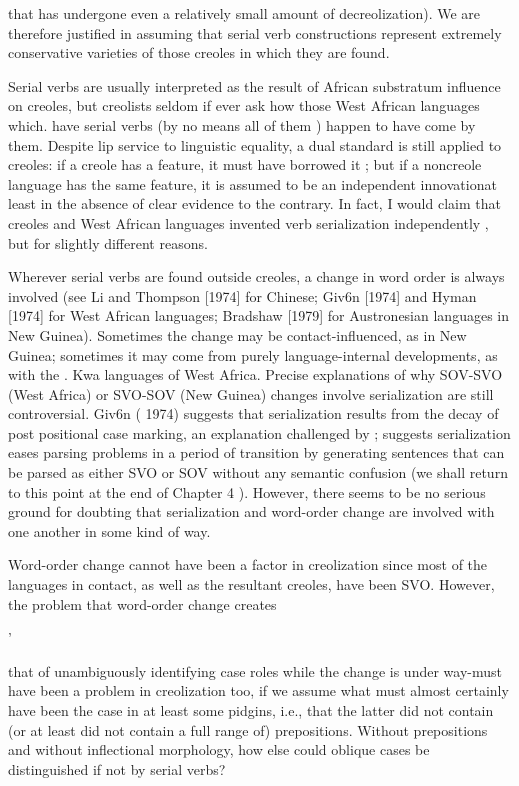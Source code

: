 
that has undergone even a relatively small amount of decreolization). We are therefore justified in assuming that serial verb constructions represent extremely conservative varieties of those creoles in which they are found.

Serial verbs are usually interpreted as the result of African substratum influence on creoles, but creolists seldom if ever ask how those West African languages which. have serial verbs (by no means all of them ) happen to have come by them. Despite lip service to linguistic equality, a dual standard is still applied to creoles: if a creole has a feature, it must have borrowed it ; but if a noncreole language has the same feature, it is assumed to be an independent innovation\-at least in the absence of clear evidence to the contrary. In fact, I would claim that creoles and West African languages invented verb serialization independently , but for slightly different reasons.

Wherever serial verbs are found outside creoles, a change in word order is always involved (see Li and Thompson [1974] for Chinese; Giv6n [1974] and Hyman [1974] for West African languages; Brad\-shaw [1979] for Austronesian languages in New Guinea). Sometimes the change may be contact-influenced, as in New Guinea; sometimes it may come from purely language-internal developments, as with the . Kwa languages of West Africa. Precise explanations of why SOV-SVO (West Africa) or SVO-SOV (New Guinea) changes involve serialization are still controversial. Giv6n ( 1974) suggests that serialization results from the decay of post positional case marking, an explanation chal\-lenged by \citet{Hyman1974}; \citet{Bradshaw1979} suggests serialization eases parsing problems in a period of transition by generating sentences that can be parsed as either SVO or SOV without any semantic confu\-sion (we shall return to this point at the end of Chapter 4 ). However, there seems to be no serious ground for doubting that serialization and word-order change are involved with one another in some kind of way.

Word-order change cannot have been a factor in creolization since most of the languages in contact, as well as the resultant creoles, have been SVO. However, the problem that word-order change creates\-

'


that of unambiguously identifying case roles while the change is under way-must have been a problem in creolization too, if we assume what must almost certainly have been the case in at least some pidgins, i.e., that the latter did not contain (or at least did not contain a full range of) prepositions. Without prepositions and without inflectional morphology, how else could oblique cases be distinguished if not by serial verbs?

